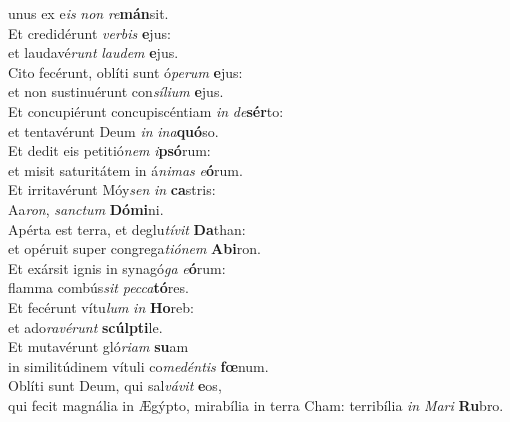 \evenverse unus ex e\textit{is} \textit{non} \textit{re}\textbf{mán}sit.\\
\oddverse Et credidérunt \textit{ver}\textit{bis} \textbf{e}jus:~\*\\
\oddverse et laudavé\textit{runt} \textit{lau}\textit{dem} \textbf{e}jus.\\
\evenverse Cito fecérunt, oblíti sunt ó\textit{pe}\textit{rum} \textbf{e}jus:~\*\\
\evenverse et non sustinuérunt con\textit{sí}\textit{li}\textit{um} \textbf{e}jus.\\
\oddverse Et concupiérunt concupiscéntiam \textit{in} \textit{de}\textbf{sér}to:~\*\\
\oddverse et tentavérunt Deum \textit{in} \textit{i}\textit{na}\textbf{quó}so.\\
\evenverse Et dedit eis petitió\textit{nem} \textit{i}\textbf{psó}rum:~\*\\
\evenverse et misit saturitátem in á\textit{ni}\textit{mas} \textit{e}\textbf{ó}rum.\\
\oddverse Et irritavérunt Móy\textit{sen} \textit{in} \textbf{ca}stris:~\*\\
\oddverse Aa\textit{ron}, \textit{san}\textit{ctum} \textbf{Dó}\textbf{mi}ni.\\
\evenverse Apérta est terra, et deglu\textit{tí}\textit{vit} \textbf{Da}than:~\*\\
\evenverse et opéruit super congrega\textit{ti}\textit{ó}\textit{nem} \textbf{A}\textbf{bi}ron.\\
\oddverse Et exársit ignis in synagó\textit{ga} \textit{e}\textbf{ó}rum:~\*\\
\oddverse flamma combús\textit{sit} \textit{pec}\textit{ca}\textbf{tó}res.\\
\evenverse Et fecérunt vítu\textit{lum} \textit{in} \textbf{Ho}reb:~\*\\
\evenverse et ado\textit{ra}\textit{vé}\textit{runt} \textbf{scúl}\textbf{pti}le.\\
\oddverse Et mutavérunt gló\textit{ri}\textit{am} \textbf{su}am~\*\\
\oddverse in similitúdinem vítuli co\textit{me}\textit{dén}\textit{tis} \textbf{fœ}num.\\
\evenverse Oblíti sunt Deum, qui sal\textit{vá}\textit{vit} \textbf{e}os,~\*\\
\evenverse qui fecit magnália in Ægýpto, mirabília in terra Cham: terribília \textit{in} \textit{Ma}\textit{ri} \textbf{Ru}bro.\\
